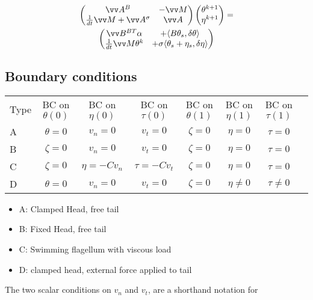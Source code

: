 \begin{multline}

\begin{pmatrix}
\vv A^B &  -\vv M  \\
\frac{1}{dt} \vv M + \vv A^\sigma & \vv A \\
\end{pmatrix}
%
\begin{pmatrix}
\theta^{k+1}\phantom{\big|\!\!}\\
\eta^{k+1}\phantom{\big|\!\!} 
\end{pmatrix}
=\\
\begin{pmatrix}
\vv B^{BT}\alpha & +\langle B\theta_s, \delta \theta\rangle\\
\frac{1}{dt} \vv M \theta^k& +\sigma \langle \theta_s+\eta_s,\delta\eta\rangle
\end{pmatrix}
\end{multline}


\subsection{Boundary conditions}\label{boundary-conditions}

\begin{tabular}{l|c|c|c|c||c|c|c|}
  Type & BC on $\theta(0)$ & BC on $\eta(0)$ & BC on $\tau(0)$ & BC on $\theta(1)$ & BC on $\eta(1)$ & BC on $\tau(1)$ \\
  A & $\theta = 0$ & $v_n = 0$ & $v_t=0$ & $\zeta = 0$ &  $\eta = 0$& $\tau = 0$  \\
  B & $\zeta = 0$ & $v_n = 0$ & $v_t=0$  & $\zeta = 0$&  $\eta = 0$& $\tau = 0$ \\
  C &  $\zeta = 0$ & $\eta = -C v_n$& $\tau =  -C v_t$ & $\zeta = 0$&  $\eta = 0$& $\tau = 0$ \\
  D  &  $\theta = 0$ & $v_n = 0$& $v_t=0$ & $\zeta = 0$& $\eta \neq 0$& $\tau \neq 0$ 
\end{tabular}


\begin{itemize}
\item A: Clamped Head, free tail
\item B: Fixed Head, free tail
\item C: Swimming flagellum with viscous load 
\item D: clamped head, external force applied to tail
\end{itemize}

The two scalar conditions on $v_n$ and $v_t$, are a shorthand notation for

